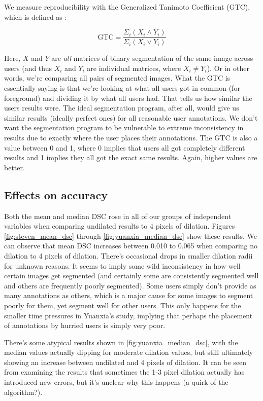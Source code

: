 \documentclass[12pt,a4paper,notitlepage]{article}
\begin{document}
We measure reproducibility with the Generalized Tanimoto Coefficient (GTC), which is defined as \cite{gtc}:

$$\text{GTC} = \frac{\Sigma_i \left( X_i \wedge Y_i \right)}{\Sigma_i \left( X_i \vee Y_i \right)}$$

Here, $X$ and $Y$ are \textit{all} matrices of binary segmentation of the same image across users (and thus $X_i$ and $Y_i$ are individual matrices, where $X_i \neq Y_i$). Or in other words, we're comparing all pairs of segmented images. What the GTC is essentially saying is that we're looking at what all users got in common (for foreground) and dividing it by what all users had. That tells us how similar the users results were. The ideal segmentation program, after all, would give us similar results (ideally perfect ones) for all reasonable user annotations. We don't want the segmentation program to be vulnerable to extreme inconsistency in results due to exactly where the user places their annotations. The GTC is also a value between 0 and 1, where 0 implies that users all got completely different results and 1 implies they all got the exact same results. Again, higher values are better.

\subsection{Effects on accuracy}
Both the mean and median DSC rose in all of our groups of independent variables when comparing undilated results to 4 pixels of dilation. Figures \ref{fig:steven_mean_dsc} through \ref{fig:yuanxia_median_dsc} show these results. We can observe that mean DSC increases between 0.010 to 0.065 when comparing no dilation to 4 pixels of dilation. There's occasional drops in smaller dilation radii for unknown reasons. It seems to imply some wild inconsistency in how well certain images get segmented (and certainly some are consistently segmented well and others are frequently poorly segmented). Some users simply don't provide as many annotations as others, which is a major cause for some images to segment poorly for them, yet segment well for other users. This only happens for the smaller time pressures in Yuanxia's study, implying that perhaps the placement of annotations by hurried users is simply very poor.

There's some atypical results shown in \ref{fig:yuanxia_median_dsc}, with the median values actually dipping for moderate dilation values, but still ultimately showing an increase between undilated and 4 pixels of dilation. It can be seen from examining the results that sometimes the 1-3 pixel dilation actually has introduced new errors, but it's unclear why this happens (a quirk of the algorithm?).
\end{document}
